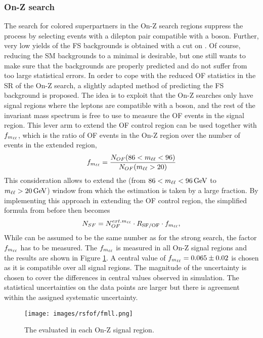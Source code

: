 \subsubsection*{On-Z search}
\noindent\justify
The search for colored superpartners in the On-Z search regions suppress the \ttbar process by selecting events with a dilepton pair compatible with a \PZ boson.
Further, very low yields of the FS backgrounds is obtained with a cut on \mttwo.
Of course, reducing the SM backgrounds to a minimal is desirable, but one still wants to make sure that the backgrounds are properly predicted and do not suffer from too large statistical errors.
In order to cope with the reduced OF statistics in the SR of the On-Z search, a slightly adapted method of predicting the FS background is proposed.
The idea is to exploit that the On-Z searches only have signal regions where the leptons are compatible with a \PZ boson, and the rest of the invariant mass spectrum is free to use to measure the OF events in the signal region.
This lever arm to extend the OF control region can be used together with $f_{m_{\ell\ell}}$, which is the ratio of OF events in the On-Z region over the number of events in the extended \mll region,
\begin{equation}
f_{m_{\ell\ell}}=\frac{N_{OF}(86<m_{\ell\ell}<96)}{N_{OF}(m_{\ell\ell}>20)}
\end{equation}
This consideration allows to extend the \mll (from $86<m_{\ell\ell}<96\,\text{Ge\hspace{-.08em}V}$ to $m_{\ell\ell}>20\,\text{Ge\hspace{-.08em}V}$) window from which the estimation is taken by a large fraction.
By implementing this approach in extending the OF control region, the simplified formula from before then becomes
\begin{equation}
\label{eq:estFSEwk}
    N_{SF} = N_{OF}^{ext.m_{\ell\ell}} \cdot R_{\text{SF/OF}} \cdot f_{m_{\ell\ell}},
\end{equation}
While \Rsfof can be assumed to be the same number as for the strong search, the factor $f_{m_{\ell\ell}}$ has to be measured.
The $f_{m_{\ell\ell}}$ is measured in all On-Z signal regions and the results are shown in Figure \ref{fig:fmll}. 
A central value of $f_{m_{\ell\ell}}=0.065\pm0.02$ is chosen as it is compatible over all signal regions.
The magnitude of the uncertainty is chosen to cover the differences in central values observed in simulation.
The statistical uncertainties on the data points are larger but there is agreement within the assigned systematic uncertainty.
\begin{figure}[htbp!]
\begin{center}
    \texttt{[image: images/rsfof/fmll.png]}
    \caption{The \fmll evaluated in each On-Z signal region.}
\label{fig:fmll}
\end{center}
\end{figure}

